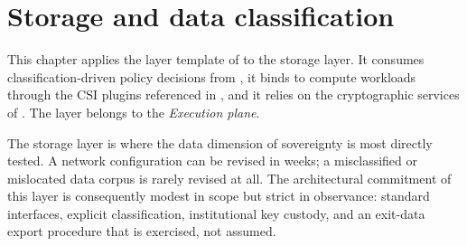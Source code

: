 
\chapter{Storage and data classification}
\label{ch:storage}

\begin{caveatbox}[Dependencies]
\noindent This chapter applies the layer template of
 to the storage layer. It consumes
classification-driven policy decisions from , it
binds to compute workloads through the CSI plugins referenced in
, and it relies on the cryptographic services
of . The layer belongs to the \emph{Execution
plane}.
\end{caveatbox}

The storage layer is where the data dimension of sovereignty is
most directly tested. A network configuration can be revised in
weeks; a misclassified or mislocated data corpus is rarely revised at
all. The architectural commitment of this layer is consequently
modest in scope but strict in observance: standard interfaces,
explicit classification, institutional key custody, and an
exit-data export procedure that is exercised, not assumed.

